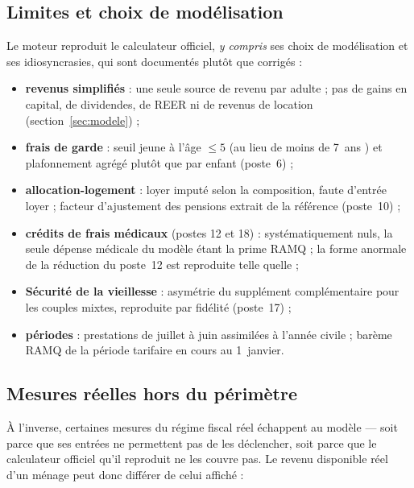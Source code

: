 \subsection{Limites et choix de modélisation}
\label{sec:limites}

Le moteur reproduit le calculateur officiel, \emph{y compris} ses choix de
modélisation et ses idiosyncrasies, qui sont documentés plutôt que
corrigés :

\begin{itemize}
  \item \textbf{revenus simplifiés} : une seule source de revenu par
        adulte ; pas de gains en capital, de dividendes, de REER ni de
        revenus de location (section~\ref{sec:modele}) ;
  \item \textbf{frais de garde} : seuil \og jeune \fg{} à l'âge $\le 5$
        (au lieu de \og moins de 7~ans \fg{}) et plafonnement agrégé
        plutôt que par enfant (poste~6) ;
  \item \textbf{allocation-logement} : loyer imputé selon la composition,
        faute d'entrée \og loyer \fg{} ; facteur d'ajustement des
        pensions extrait de la référence (poste~10) ;
  \item \textbf{crédits de frais médicaux} (postes 12 et 18) :
        systématiquement nuls, la seule dépense médicale du modèle étant
        la prime RAMQ ; la forme anormale de la réduction du poste~12 est
        reproduite telle quelle ;
  \item \textbf{Sécurité de la vieillesse} : asymétrie du supplément
        complémentaire pour les couples mixtes, reproduite par fidélité
        (poste~17) ;
  \item \textbf{périodes} : prestations de juillet à juin assimilées à
        l'année civile ; barème RAMQ de la période tarifaire en cours au
        1\ier{}~janvier.
\end{itemize}

\subsection{Mesures réelles hors du périmètre}
\label{sec:hors-perimetre}

À l'inverse, certaines mesures du régime fiscal réel échappent au modèle
--- soit parce que ses entrées ne permettent pas de les déclencher, soit
parce que le calculateur officiel qu'il reproduit ne les couvre pas. Le
revenu disponible réel d'un ménage peut donc différer de celui affiché :

